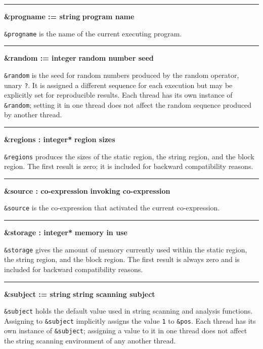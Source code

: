 \bigskip\hrule\vspace{0.1cm}
\noindent
{\bf \&progname := string } \hfill {\bf program name}

\noindent
{}\texttt{\&progname} is the name of the current
executing program.

\bigskip\hrule\vspace{0.1cm}
\noindent
{\bf \&random := integer } \hfill {\bf random number seed}

\noindent
{}\texttt{\&random} is the seed for random
numbers produced by the random operator, unary \texttt{?}. It is
assigned a different sequence for each execution but may be explicitly
set for reproducible results. Each thread has its own instance of
\texttt{\&random}; \ConcurrencyIssue setting it in one thread does
not affect the random sequence produced by another thread.
\bigskip\hrule\vspace{0.1cm}
\noindent
{\bf \&regions : integer* } \hfill {\bf region sizes}

\noindent
{}\texttt{\&regions} produces the sizes of the static
region, the string region, and the block region. The first result is
zero; it is included for backward compatibility reasons.

\bigskip\hrule\vspace{0.1cm}
\noindent
{\bf \&source : co{}-expression } \hfill {\bf invoking co{}-expression}

\noindent
\texttt{\&source} is the co-expression that activated the current
co-expression.

\bigskip\hrule\vspace{0.1cm}
\noindent
{\bf \&storage : integer* } \hfill {\bf memory in use}

\noindent
{}\texttt{\&storage} gives the amount of memory
currently used within the static region, the string region, and the
block region. The first result is always zero and is included for
backward compatibility reasons.

\bigskip\hrule\vspace{0.1cm}
\noindent
{\bf \&subject := string } \hfill {\bf string scanning subject}

\noindent
{}\texttt{\&subject} holds the default
value used in string scanning and analysis functions. Assigning to
\texttt{\&subject} implicitly assigns the value \texttt{1} to
\texttt{\&pos}.
Each thread has its own instance of 
\texttt{\&subject}; \ConcurrencyIssue assigning a value to it in one
thread does not affect the string scanning environment of any another thread.

